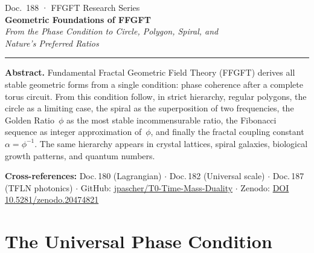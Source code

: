 
\thispagestyle{firstpage}
\begin{center}
  {\small\color{T0gray} Doc.~188 · FFGFT Research Series}\\[6pt]
  {\LARGE\bfseries\color{T0blue}
    Geometric Foundations of FFGFT}\\[6pt]
  {\large\itshape\color{T0gray}
    From the Phase Condition to Circle, Polygon, Spiral, and\\
    Nature's Preferred Ratios}\\[8pt]
  {\color{T0red}\rule{0.65\linewidth}{1.5pt}}
\end{center}
\vspace{4pt}

\begin{infobox}
\textbf{Abstract.}
Fundamental Fractal Geometric Field Theory (FFGFT) derives all
stable geometric forms from a single condition: phase coherence
after a complete torus circuit. From this condition follow, in
strict hierarchy, regular polygons, the circle as a limiting case,
the spiral as the superposition of two frequencies, the Golden
Ratio~$\phi$ as the most stable incommensurable ratio, the Fibonacci
sequence as integer approximation of~$\phi$, and finally the fractal
coupling constant~$\alpha = \phi^{-1}$. The same hierarchy appears
in crystal lattices, spiral galaxies, biological growth patterns,
and quantum numbers.

\smallskip\noindent\textbf{Cross-references:}
Doc.\,180 (Lagrangian) $\cdot$
Doc.\,182 (Universal scale) $\cdot$
Doc.\,187 (TFLN photonics) $\cdot$
GitHub: \href{https://github.com/jpascher/T0-Time-Mass-Duality}{jpascher/T0-Time-Mass-Duality} $\cdot$
Zenodo: \href{https://zenodo.org/records/20474821}{DOI 10.5281/zenodo.20474821}
\end{infobox}

\tableofcontents
\bigskip

\section{The Universal Phase Condition}

